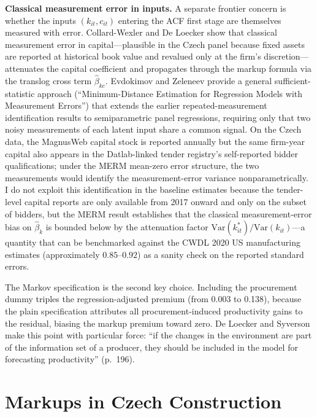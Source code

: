 \documentclass[11pt]{article}
\begin{document}
\textbf{Classical measurement error in inputs.} A separate frontier concern is whether the inputs $(k_{it}, c_{it})$ entering the ACF first stage are themselves measured with error. Collard-Wexler and De Loecker \cite{CWDLKvsOmega} show that classical measurement error in capital---plausible in the Czech panel because fixed assets are reported at historical book value and revalued only at the firm's discretion---attenuates the capital coefficient and propagates through the markup formula via the translog cross term $\hat\beta_{kc}$. Evdokimov and Zeleneev \cite{EvdokimovZeleneev2025MERM} provide a general sufficient-statistic approach (``Minimum-Distance Estimation for Regression Models with Measurement Errors'') that extends the earlier repeated-measurement identification results to semiparametric panel regressions, requiring only that two noisy measurements of each latent input share a common signal. On the Czech data, the MagnusWeb capital stock is reported annually but the same firm-year capital also appears in the Datlab-linked tender registry's self-reported bidder qualifications; under the MERM mean-zero error structure, the two measurements would identify the measurement-error variance nonparametrically. I do not exploit this identification in the baseline estimates because the tender-level capital reports are only available from 2017 onward and only on the subset of bidders, but the MERM result establishes that the classical measurement-error bias on $\hat\beta_k$ is bounded below by the attenuation factor $\text{Var}(k^*_{it})/\text{Var}(k_{it})$---a quantity that can be benchmarked against the CWDL 2020 US manufacturing estimates (approximately $0.85$--$0.92$) as a sanity check on the reported standard errors.

The Markov specification is the second key choice. Including the procurement dummy triples the regression-adjusted premium (from 0.003 to 0.138), because the plain specification attributes all procurement-induced productivity gains to the residual, biasing the markup premium toward zero. De Loecker and Syverson \cite{DLS2021} make this point with particular force: ``if the changes in the environment are part of the information set of a producer, they should be included in the model for forecasting productivity'' (p.~196).


\section{Markups in Czech Construction}\label{sec:results}
\end{document}
